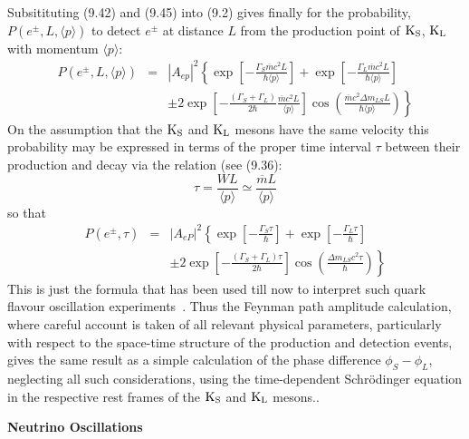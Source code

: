 {   Subsitituting (9.42) and (9.45) into (9.2) gives finally for the probability,
  $ P(e^{\pm},L,\langle p \rangle)$ to detect $e^{\pm}$ at distance
  $L$ from the production point of ${\rm K_S}$, ${\rm K_L}$ with momentum $ \langle p \rangle$:
      \begin{eqnarray}
  P(e^{\pm},L,\langle p \rangle) &  =  & |A_{ep}|^2\left\{ \exp\left[-\frac{\Gamma_S \overline{m}c^2 L}
   { \hbar \langle p \rangle}\right]
  +\exp\left[-\frac{\Gamma_L \overline{m}c^2 L}{ \hbar \langle p \rangle}\right] \right. \nonumber \\
   &  &\pm 2 \left. \exp\left[-\frac{(\Gamma_S+\Gamma_L)}{2 \hbar }\frac{\overline{m}c^2 L}{ \langle p \rangle }
  \right] \cos \left(\frac{\overline{m}c^2 \Delta m_{LS} L}{\hbar \langle p \rangle} \right)\right\}    
      \end{eqnarray} 
  On the assumption that the  ${\rm K_S}$ and ${\rm K_L}$ mesons have the same velocity this probability
 may be expressed in terms of the proper time interval $\tau$ between their production and decay via the 
  relation (see (9.36):
  \begin{equation}
    \tau = \frac{W L}{ \langle p \rangle } \simeq \frac{\overline{m} L}{ \langle p \rangle}
  \end{equation}
  so that 
      \begin{eqnarray}
  P(e^{\pm},\tau) &  =  & |A_{eP}|^2 \left\{ \exp \left[-\frac{\Gamma_S \tau}{\hbar}\right]
  +\exp \left[-\frac{\Gamma_L \tau}{\hbar}\right] \right. \nonumber \\
   &  &  \pm 2 \left. \exp \left[-\frac{(\Gamma_S+\Gamma_L) \tau}{2 \hbar}
  \right] \cos \left(\frac{\Delta m_{LS} c^2 \tau}{\hbar} \right)\right\}    
      \end{eqnarray}                    
 This is just the formula that has been used till now to interpret such quark flavour oscillation
  experiments~\cite{DSDQ,JACK,CPLEAR}. Thus the Feynman path amplitude calculation,
 where careful account is taken of all relevant physical parameters, particularly with 
 respect to the space-time structure of the production and detection events, gives the
 same result as a simple calculation of the phase difference
 $\phi_S-\phi_L$, neglecting all such considerations, using the time-dependent Schr\"{o}dinger equation in the
 respective rest frames of the ${\rm K_S}$ and ${\rm K_L}$ mesons..

\par {\bf \Large Neutrino Oscillations}

}
